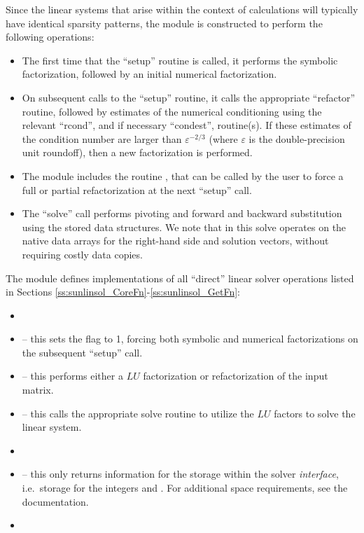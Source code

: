 Since the linear systems that arise within the context of {\sundials}
calculations will typically have identical sparsity patterns, the
{\sunlinsolklu} module is constructed to perform the
following operations:
\begin{itemize}
\item The first time that the ``setup'' routine is called, it
  performs the symbolic factorization, followed by an initial
  numerical factorization.  
\item On subsequent calls to the ``setup'' routine, it calls the
  appropriate {\klu} ``refactor'' routine, followed by estimates of
  the numerical conditioning using the relevant ``rcond'', and if
  necessary ``condest'', routine(s).  If these estimates of the
  condition number are larger than $\varepsilon^{-2/3}$ (where
  $\varepsilon$ is the double-precision unit roundoff), then a new
  factorization is performed.
\item The module includes the routine , that 
  can be called by the user to force a full or partial refactorization
  at the next ``setup'' call. 
\item The ``solve'' call performs pivoting and forward and
  backward substitution using the stored {\klu} data structures.  We
  note that in this solve {\klu} operates on the native data arrays
  for the right-hand side and solution vectors, without requiring
  costly data copies.
\end{itemize}



\noindent The {\sunlinsolklu} module defines implementations of all
``direct'' linear solver operations listed in Sections
\ref{ss:sunlinsol_CoreFn}-\ref{ss:sunlinsol_GetFn}:
\begin{itemize}
\item {}
\item {} -- this sets the
   flag to 1, forcing both symbolic and numerical
  factorizations on the subsequent ``setup'' call.
\item {} -- this performs either a $LU$
  factorization or refactorization of the input matrix.
\item {} -- this calls the appropriate {\klu}
  solve routine to utilize the $LU$ factors to solve the linear
  system. 
\item {}
\item {} -- this only returns information for
  the storage within the solver \emph{interface}, i.e.~storage for the
  integers  and .  For additional
  space requirements, see the {\klu} documentation.
\item {}
\end{itemize}
